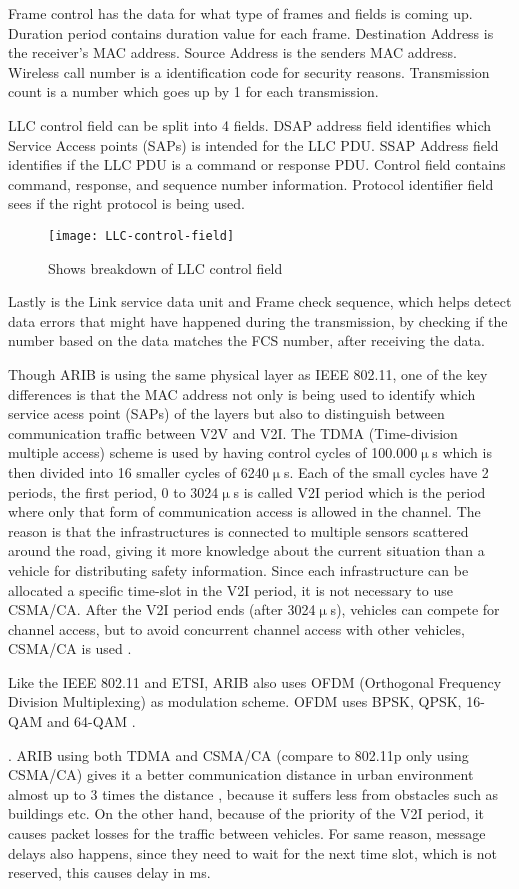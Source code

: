 Frame control has the data for what type of frames and fields is coming up. Duration period contains duration value for each frame. Destination Address is the receiver's MAC address. Source Address is the senders MAC address. Wireless call number is a identification code for security reasons. Transmission count is a number which goes up by 1 for each transmission. 

LLC control field can be split into 4 fields. DSAP address field identifies which Service Access points (SAPs) is intended for the LLC PDU. SSAP Address field identifies if the LLC PDU is a command or response PDU. Control field contains command, response, and sequence number information. Protocol identifier field sees if the right protocol is being used.
\begin{figure}[h]
    \centering
    \texttt{[image: LLC-control-field]}
    \caption{Shows breakdown of LLC control field}
    \label{fig:LLC}
\end{figure}
Lastly is the Link service data unit and Frame check sequence, which helps detect data errors that might have happened during the transmission, by checking if the number based on the data matches the FCS number, after receiving the data. 
\par
% 
Though ARIB is using the same physical layer as IEEE 802.11, one of the key differences is that the MAC address not only is being used to identify which service acess point (SAPs) of the layers but also to distinguish between communication traffic between V2V and V2I. The TDMA (Time-division multiple access) scheme is used by having control cycles of 100.000$\upmu$s which is then divided into 16 smaller cycles of  6240$\upmu$s. Each of the small cycles have 2 periods, the first period, 0 to 3024$\upmu$s is called V2I period which is the period where only that form of communication access is allowed in the channel. The reason is that the infrastructures is connected to multiple sensors scattered around the road, giving it more knowledge about the current situation than a vehicle for distributing safety information. Since each infrastructure can be allocated a specific time-slot in the V2I period, it is not necessary to use CSMA/CA. After the V2I period ends (after 3024$\upmu$s), vehicles can compete for channel access, but to avoid concurrent channel access with other vehicles, CSMA/CA is used \cite{Heinovski2016PerformanceSTD-T109}.\par
% 
Like the IEEE 802.11 and ETSI, ARIB also uses OFDM (Orthogonal Frequency Division 
Multiplexing) as modulation scheme. OFDM uses BPSK, QPSK, 16-QAM and 64-QAM \footnotemark.\par.
% 
% 
ARIB using both TDMA and CSMA/CA (compare to 802.11p only using CSMA/CA) gives it a better communication distance in urban environment almost up to 3 times the distance \cite{Heinovski2016PerformanceSTD-T109}, because it suffers less from obstacles such as buildings etc. On the other hand, because of the priority of the V2I period, it causes packet losses for the traffic between vehicles. For same reason, message delays also happens, since they need to wait for the next time slot, which is not reserved, this causes delay in ms. 